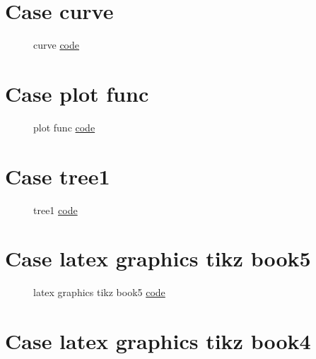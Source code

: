 \documentclass{article}
\begin{document}
\section{Case curve}

\begin{figure}[H]
    \centering
    
    \caption{curve \href{https:/github.com/cauliyang/learn_tikz/blob/main/source/source/curve.tex}{code} }
    \label{fig:curve}
\end{figure}

\section{Case plot func}

\begin{figure}[H]
    \centering
    
    \caption{plot func \href{https:/github.com/cauliyang/learn_tikz/blob/main/source/source/plot_func.tex}{code} }
    \label{fig:plot func}
\end{figure}

\section{Case tree1}

\begin{figure}[H]
    \centering
    
    \caption{tree1 \href{https:/github.com/cauliyang/learn_tikz/blob/main/source/source/tree1.tex}{code} }
    \label{fig:tree1}
\end{figure}

\section{Case latex graphics tikz book5}

\begin{figure}[H]
    \centering
    
    \caption{latex graphics tikz book5 \href{https:/github.com/cauliyang/learn_tikz/blob/main/source/source/latex_graphics_tikz_book5.tex}{code} }
    \label{fig:latex graphics tikz book5}
\end{figure}

\section{Case latex graphics tikz book4}
\end{document}
